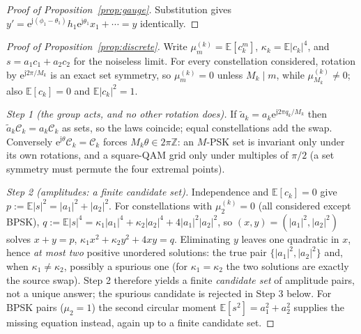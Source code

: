 \documentclass[journal]{IEEEtran}
\newcommand{\ee}{\mathrm{e}}
\newcommand{\jj}{\mathrm{j}}
\newcommand{\const}{\mathcal{C}}
\begin{document}
\begin{proof}[Proof of Proposition~\ref{prop:gauge}]
Substitution gives $y' = \ee^{\jj(\phi_1 - \theta_1)} h_1
\ee^{\jj\theta_1} x_1 + \cdots = y$ identically.
\end{proof}

\begin{proof}[Proof of Proposition~\ref{prop:discrete}]
Write $\mu_m^{(k)} = \mathbb{E}[c_k^m]$, $\kappa_k =
\mathbb{E}|c_k|^4$, and $s = a_1 c_1 + a_2 c_2$ for the noiseless
limit. For every constellation considered, rotation by
$\ee^{\jj 2\pi/M_k}$ is an exact set symmetry, so $\mu_m^{(k)} = 0$
unless $M_k \mid m$, while $\mu_{M_k}^{(k)} \neq 0$; also
$\mathbb{E}[c_k] = 0$ and $\mathbb{E}|c_k|^2 = 1$.

\emph{Step 1 (the group acts, and no other rotation does).} If
$\tilde a_k = a_k \ee^{\jj 2\pi q_k/M_k}$ then $\tilde a_k \const_k =
a_k \const_k$ as sets, so the laws coincide; equal constellations add
the swap. Conversely $\ee^{\jj\theta}\const_k = \const_k$ forces
$M_k \theta \in 2\pi\mathbb{Z}$: an $M$-PSK set is invariant only under
its own rotations, and a square-QAM grid only under multiples of
$\pi/2$ (a set symmetry must permute the four extremal points).

\emph{Step 2 (amplitudes: a finite candidate set).} Independence and
$\mathbb{E}[c_k] = 0$ give
$p := \mathbb{E}|s|^2 = |a_1|^2 + |a_2|^2$. For constellations with
$\mu_2^{(k)} = 0$ (all considered except BPSK),
$q := \mathbb{E}|s|^4 = \kappa_1 |a_1|^4 + \kappa_2 |a_2|^4 +
4|a_1|^2|a_2|^2$, so $(x, y) = (|a_1|^2, |a_2|^2)$ solves $x + y = p$,
$\kappa_1 x^2 + \kappa_2 y^2 + 4xy = q$. Eliminating $y$ leaves one
quadratic in $x$, hence \emph{at most two} positive unordered
solutions: the true pair $\{|a_1|^2, |a_2|^2\}$ and, when
$\kappa_1 \neq \kappa_2$, possibly a spurious one (for
$\kappa_1 = \kappa_2$ the two solutions are exactly the source swap).
Step 2 therefore yields a finite \emph{candidate set} of amplitude
pairs, not a unique answer; the spurious candidate is rejected in
Step 3 below. For BPSK pairs
($\mu_2 = 1$) the second circular moment $\mathbb{E}[s^2] = a_1^2 +
a_2^2$ supplies the missing equation instead, again up to a finite
candidate set.


\end{proof}
\end{document}
